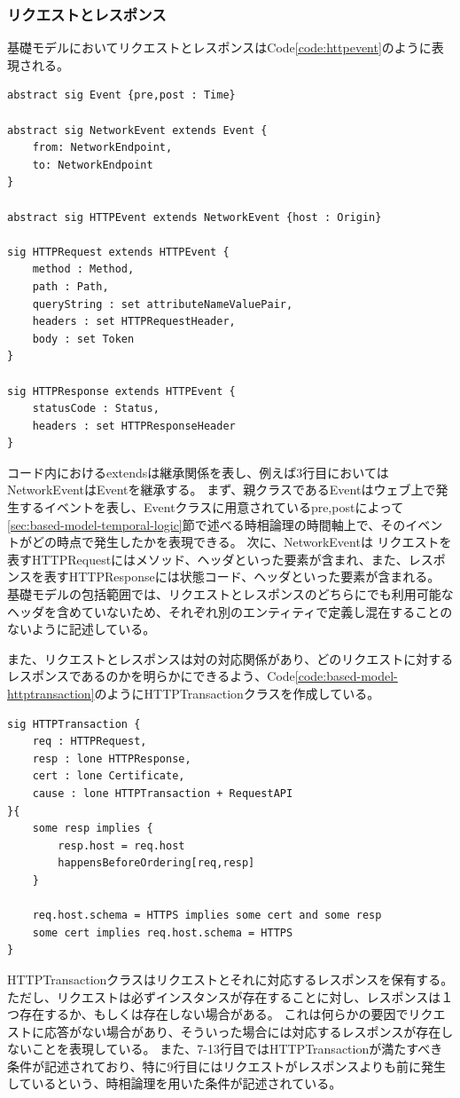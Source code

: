 \documentclass[12pt,a4paper]{jbook}
\begin{document}
\subsubsection{リクエストとレスポンス}
基礎モデルにおいてリクエストとレスポンスはCode\ref{code:httpevent}のように表現される。
\begin{lstlisting}[caption=リクエストとレスポンスを表現するクラス, label=code:httpevent]
abstract sig Event {pre,post : Time}

abstract sig NetworkEvent extends Event {
	from: NetworkEndpoint,
	to: NetworkEndpoint
}

abstract sig HTTPEvent extends NetworkEvent {host : Origin}

sig HTTPRequest extends HTTPEvent { 
	method : Method,
	path : Path,
	queryString : set attributeNameValuePair,
	headers : set HTTPRequestHeader,
	body : set Token
}

sig HTTPResponse extends HTTPEvent {
	statusCode : Status,
	headers : set HTTPResponseHeader
}
\end{lstlisting}
コード内におけるextendsは継承関係を表し、例えば3行目においてはNetworkEventはEventを継承する。
まず、親クラスであるEventはウェブ上で発生するイベントを表し、Eventクラスに用意されているpre,postによって\ref{sec:based-model-temporal-logic}節で述べる時相論理の時間軸上で、そのイベントがどの時点で発生したかを表現できる。
次に、NetworkEventは
リクエストを表すHTTPRequestにはメソッド、ヘッダといった要素が含まれ、また、レスポンスを表すHTTPResponseには状態コード、ヘッダといった要素が含まれる。
基礎モデルの包括範囲では、リクエストとレスポンスのどちらにでも利用可能なヘッダを含めていないため、それぞれ別のエンティティで定義し混在することのないように記述している。

また、リクエストとレスポンスは対の対応関係があり、どのリクエストに対するレスポンスであるのかを明らかにできるよう、Code\ref{code:based-model-httptransaction}のようにHTTPTransactionクラスを作成している。
\begin{lstlisting}[caption=リクエストとレスポンスの対応関係, label=code:based-model-httptransaction]
sig HTTPTransaction {
	req : HTTPRequest,
	resp : lone HTTPResponse,
	cert : lone Certificate,
	cause : lone HTTPTransaction + RequestAPI
}{
	some resp implies {
		resp.host = req.host
		happensBeforeOrdering[req,resp]
	}

	req.host.schema = HTTPS implies some cert and some resp
	some cert implies req.host.schema = HTTPS
}
\end{lstlisting}
HTTPTransactionクラスはリクエストとそれに対応するレスポンスを保有する。
ただし、リクエストは必ずインスタンスが存在することに対し、レスポンスは１つ存在するか、もしくは存在しない場合がある。
これは何らかの要因でリクエストに応答がない場合があり、そういった場合には対応するレスポンスが存在しないことを表現している。
また、7-13行目ではHTTPTransactionが満たすべき条件が記述されており、特に9行目にはリクエストがレスポンスよりも前に発生しているという、時相論理を用いた条件が記述されている。
\end{document}
